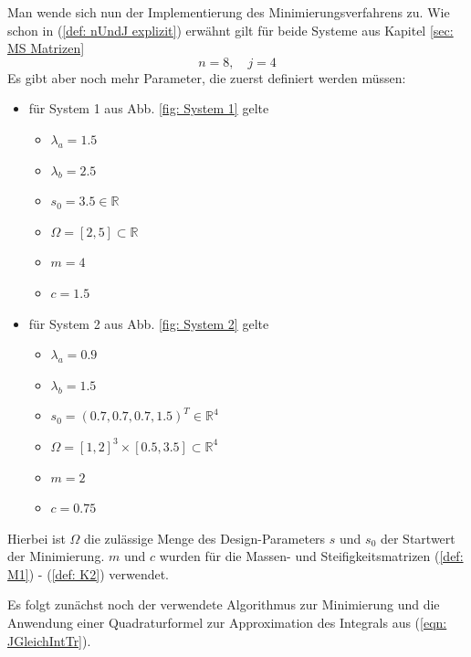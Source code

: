 \documentclass[a4paper,12pt]{report}
\newcommand{\R}{\mathbb R}
\newcommand{\1}{\mathds{1}}
\theoremstyle{plain} %
\theoremstyle{definition} %
\theoremstyle{remark}
\begin{document}
      Man wende sich nun der Implementierung des Minimierungsverfahrens zu.
      Wie schon in (\ref{def: nUndJ explizit}) erwähnt gilt für beide Systeme aus Kapitel \ref{sec: MS Matrizen}
      $$n=8,\quad j=4$$
      Es gibt aber noch mehr Parameter, die zuerst definiert werden müssen:
      \begin{itemize}
            \item für System 1 aus Abb. \ref{fig: System 1} gelte
            \begin{itemize}
                  \item $\lambda_a = 1.5$
                  \item $\lambda_b = 2.5$
                  \item $s_0 = 3.5\in\R$
                  \item $\Omega = [2,5]\subset \R$
                  \item $m = 4$
                  \item $c = 1.5$
            \end{itemize}
            \item für System 2 aus Abb. \ref{fig: System 2} gelte
            \begin{itemize}
                  \item $\lambda_a = 0.9$
                  \item $\lambda_b = 1.5$
                  \item $s_0 = (0.7, 0.7, 0.7, 1.5)^T\in \R^4$
                  \item $\Omega = [1,2]^3\times [0.5,3.5]\subset \R^4$
                  \item $m = 2$
                  \item $c = 0.75$
            \end{itemize}
      \end{itemize}

      Hierbei ist $\Omega$ die zulässige Menge des Design-Parameters $s$ und $s_0$ der Startwert der Minimierung.
      $m$ und $c$ wurden für die Massen- und Steifigkeitsmatrizen (\ref{def: M1}) - (\ref{def: K2}) verwendet.


      Es folgt zunächst noch der verwendete Algorithmus zur Minimierung und die Anwendung einer Quadraturformel zur Approximation des Integrals aus (\ref{eqn: JGleichIntTr}).
\end{document}
